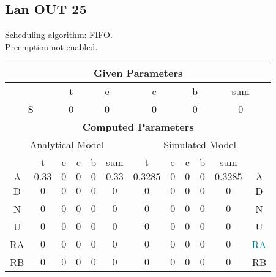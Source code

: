 \documentclass{article}
\begin{document}
\subsection{Lan OUT 25}
Scheduling algorithm: FIFO.\\Preemption not enabled. \\\begin{table}[H]\centering\begin{tabular}{@{}c|cccc|c||cccc|c|c@{}}\toprule\multicolumn{12}{c}{\textbf{Given Parameters}}\\\midrule\multicolumn{2}{c|}{ } & \multicolumn{2}{c}{t} & \multicolumn{2}{c}{e} & \multicolumn{2}{c}{c} & \multicolumn{2}{c}{b} & \multicolumn{2}{|c}{sum} \\ \midrule\multicolumn{2}{c|}{S} & \multicolumn{2}{c}{0} & \multicolumn{2}{c}{0} & \multicolumn{2}{c}{0} & \multicolumn{2}{c}{0} & \multicolumn{2}{|c}{0}\\ \midrule\midrule\multicolumn{12}{c}{\textbf{Computed Parameters}}\\ \midrule\multicolumn{6}{c||}{Analytical Model} & \multicolumn{6}{c}{Simulated Model}\\ 
 \midrule & t & e & c & b & sum & t & e & c & b & sum &  \\ \midrule$\lambda$ &$0.33$ & $0$ & $0$ & $0$ & $0.33$ & $0.3285$ & $0$ & $0$ & $0$ & $0.3285$& $\lambda$ \\D & $0$ & $0$ & $0$ & $0$ & $0$ & $0$ & $0$ & $0$ & $0$ & $0$& D\\N & $0$ & $0$ & $0$ & $0$ & $0$ & $0$ & $0$ & $0$ & $0$ & $0$& N\\U & $0$ & $0$ & $0$ & $0$ & $0$ & $0$ & $0$ & $0$ & $0$ & $0$& U\\RA & $0$ & $0$ & $0$ & $0$ & $0$ & $0$ & $0$ & $0$ & $0$ & $0$& \textcolor{teal}{RA}\\RB & $0$ & $0$ & $0$ & $0$ & $0$ & $0$ & $0$ & $0$ & $0$ & $0$& RB\\
\bottomrule
\end{tabular}
\end{table}
\filbreak
\end{document}
